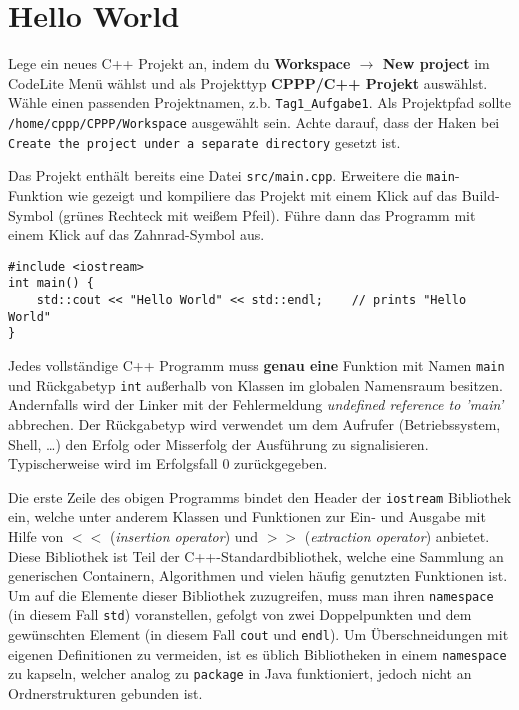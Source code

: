 
\section{Hello World}
Lege ein neues C++ Projekt an, indem du \textbf{Workspace $\rightarrow$ New project} im CodeLite Menü wählst und als Projekttyp \textbf{CPPP/C++ Projekt} auswählst.
Wähle einen passenden Projektnamen, z.b. \texttt{Tag1\_Aufgabe1}. Als Projektpfad sollte \texttt{/home/cppp/CPPP/Workspace} ausgewählt sein. Achte darauf, dass der Haken bei \texttt{Create the project under a separate directory} gesetzt ist.

Das Projekt enthält bereits eine Datei \texttt{src/main.cpp}. Erweitere die \texttt{main}-Funktion wie gezeigt und kompiliere das Projekt mit einem Klick auf das Build-Symbol (grünes Rechteck mit weißem Pfeil). Führe dann das Programm mit einem Klick auf das Zahnrad-Symbol aus.

\begin{minipage}{\textwidth} 
\begin{lstlisting}
#include <iostream>
int main() {
	std::cout << "Hello World" << std::endl;	// prints "Hello World"
}
\end{lstlisting}
\end{minipage}


Jedes vollständige C++ Programm muss \textbf{genau eine} Funktion mit Namen \lstinline{main} und Rückgabetyp \lstinline{int} außerhalb von Klassen im globalen Namensraum besitzen. Andernfalls wird der Linker mit der Fehlermeldung \emph{undefined reference to 'main'} abbrechen.
Der Rückgabetyp wird verwendet um dem Aufrufer (Betriebssystem, Shell, \dots) den Erfolg oder Misserfolg der Ausführung zu signalisieren.
Typischerweise wird im Erfolgsfall 0 zurückgegeben.

Die erste Zeile des obigen Programms bindet den Header der \lstinline{iostream} Bibliothek ein, welche unter anderem Klassen und Funktionen zur Ein- und Ausgabe mit Hilfe von $<<$ (\emph{insertion operator}) und $>>$ (\emph{extraction operator}) anbietet.
Diese Bibliothek ist Teil der C++-Standardbibliothek, welche eine Sammlung an generischen Containern, Algorithmen und vielen häufig genutzten Funktionen ist.
Um auf die Elemente dieser Bibliothek zuzugreifen, muss man ihren \lstinline{namespace} (in diesem Fall \lstinline{std}) voranstellen, gefolgt von zwei Doppelpunkten und dem gewünschten Element (in diesem Fall \lstinline{cout} und \lstinline{endl}).
Um Überschneidungen mit eigenen Definitionen zu vermeiden, ist es üblich Bibliotheken in einem \lstinline{namespace} zu kapseln, welcher analog zu \lstinline{package} in Java funktioniert, jedoch nicht an Ordnerstrukturen gebunden ist.

